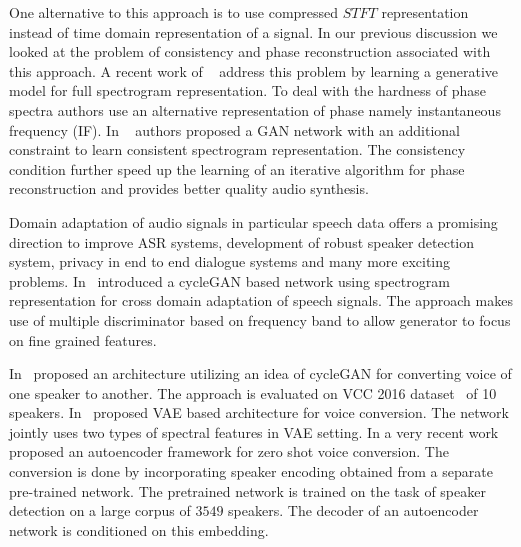 One alternative to this approach is to use compressed $STFT$ representation instead of time domain representation of a signal. In our previous discussion we looked at the problem of consistency and phase reconstruction associated with this approach. A recent work of ~\cite{engel2019gansynth} address this problem by learning a generative model for full spectrogram representation. To deal with the hardness of phase spectra authors use an alternative representation of phase namely instantaneous frequency (IF). In ~\cite{marafiotiadversarial} authors proposed a GAN network with an additional constraint to learn consistent spectrogram representation. The consistency condition further speed up the learning of an iterative algorithm for phase reconstruction and provides better quality audio synthesis.

Domain adaptation of audio signals in particular speech data offers a promising direction to improve ASR systems, development of robust speaker detection system, privacy in end to end dialogue systems and many more exciting problems. In~\cite{hosseini2018multi} introduced a cycleGAN based network using spectrogram representation for cross domain adaptation of speech signals. The approach makes use of multiple discriminator based on frequency band to allow generator to focus on fine grained features.

In~\cite{kaneko2017parallel} proposed an architecture utilizing an idea of cycleGAN for converting voice of one speaker to another. The approach is evaluated on VCC 2016 dataset~\cite{nakashika2016non} of 10 speakers. In~\cite{huang2018voice} proposed VAE based architecture for voice conversion. The network jointly uses two types of spectral features in VAE setting.
In a very recent work~\cite{qian2019autovc} proposed an autoencoder framework for zero shot voice conversion. The conversion is done by incorporating speaker encoding obtained from a separate pre-trained network. The pretrained network is trained on the task of speaker detection on a large corpus of $3549$ speakers. The decoder of an autoencoder network is conditioned on this embedding.

